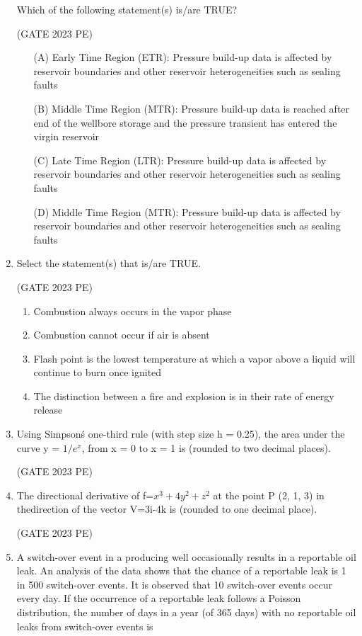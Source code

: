\documentclass[journal,12pt,onecolumn]{exam}
\theoremstyle{remark}
\begin{document}
\begin{enumerate}
Which of the following statement(s) is/are TRUE?

\hfill{(GATE 2023 PE)}\\
\begin{enumerate}
\item[(A)] Early Time Region (ETR): Pressure build-up data is affected by reservoir 
boundaries and other reservoir heterogeneities such as sealing faults
\item[(B)] Middle Time Region (MTR): Pressure build-up data is reached after end of the 
wellbore storage and the pressure transient has entered the virgin reservoir
\item[(C)] Late Time Region (LTR): Pressure build-up data is affected by reservoir 
boundaries and other reservoir heterogeneities such as sealing faults
\item[(D)] Middle Time Region (MTR): Pressure build-up data is affected by reservoir 
boundaries and other reservoir heterogeneities such as sealing faults
\end{enumerate}
\item Select the statement(s) that is/are TRUE.

\hfill{(GATE 2023 PE)}\\
\begin{enumerate}
    \item Combustion always occurs in the vapor phase
    \item Combustion cannot occur if air is absent
    \item Flash point is the lowest temperature at which a vapor above a liquid will
continue to burn once ignited
    \item The distinction between a fire and explosion is in their rate of energy release
\end{enumerate}
\item Using Simpson\'s one-third rule (with step size h = 0.25), the area under the curve
y = $1/e^x$, from x = 0 to x = 1 is (rounded to two decimal places).

\hfill{(GATE 2023 PE)}\\
\item The directional derivative of f=$x^3+4y^2+z^2$ at the point P (2, 1, 3) in thedirection of the vector V=3i-4k is (rounded to one decimal place).

\hfill{(GATE 2023 PE)}
\item A switch-over event in a producing well occasionally results in a reportable oil
leak. An analysis of the data shows that the chance of a reportable leak is 1 in 500
switch-over events. It is observed that 10 switch-over events occur every day.
If the occurrence of a reportable leak follows a Poisson distribution, the number
of days in a year (of 365 days) with no reportable oil leaks from switch-over events is


\end{enumerate}
\end{document}
